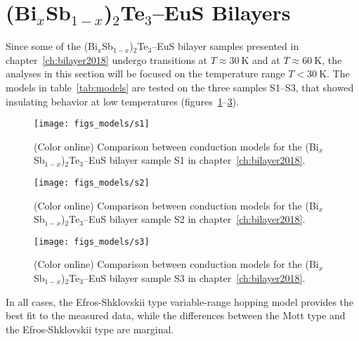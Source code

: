 \section{(Bi$_x$Sb$_{1-x}$)$_2$Te$_3$--EuS Bilayers}
Since some of the (Bi$_x$Sb$_{1-x}$)$_2$Te$_3$--EuS bilayer samples presented in chapter~\ref{ch:bilayer2018} undergo transitions at $T\approx 30~\mathrm{K}$ and at $T \approx 60~\mathrm{K}$, the analyses in this section will be focused on the temperature range $T < 30~\mathrm{K}$. The models in table~\ref{tab:models} are tested on the three samples S1--S3, that showed insulating behavior at low temperatures (figures~\ref{fig:models_s1}--\ref{fig:models_s3}).%
%
\begin{figure}[h!]%
    \centering%
    \texttt{[image: figs\_models/s1]}%
    \caption[Conduction model comparison: (Bi$_x$Sb$_{1-x}$)$_2$Te$_3$--EuS bilayer: S1]{\label{fig:models_s1}(Color online) Comparison between conduction models for the (Bi$_x$Sb$_{1-x}$)$_2$Te$_3$--EuS bilayer sample S1 in chapter~\ref{ch:bilayer2018}.}%
\end{figure}%
%
\begin{figure}[h!]%
    \centering%
    \texttt{[image: figs\_models/s2]}%
    \caption[Conduction model comparison: (Bi$_x$Sb$_{1-x}$)$_2$Te$_3$--EuS bilayer: S2]{\label{fig:models_s2}(Color online) Comparison between conduction models for the (Bi$_x$Sb$_{1-x}$)$_2$Te$_3$--EuS bilayer sample S2 in chapter~\ref{ch:bilayer2018}.}%
\end{figure}%
%
\begin{figure}[h!]%
    \centering%
    \texttt{[image: figs\_models/s3]}%
    \caption[Conduction model comparison: (Bi$_x$Sb$_{1-x}$)$_2$Te$_3$--EuS bilayer: S3]{\label{fig:models_s3}(Color online) Comparison between conduction models for the (Bi$_x$Sb$_{1-x}$)$_2$Te$_3$--EuS bilayer sample S3 in chapter~\ref{ch:bilayer2018}.}%
\end{figure}%

In all cases, the Efros-Shklovskii type variable-range hopping model provides the best fit to the measured data, while the differences between the Mott type and the Efros-Shklovskii type are marginal.


